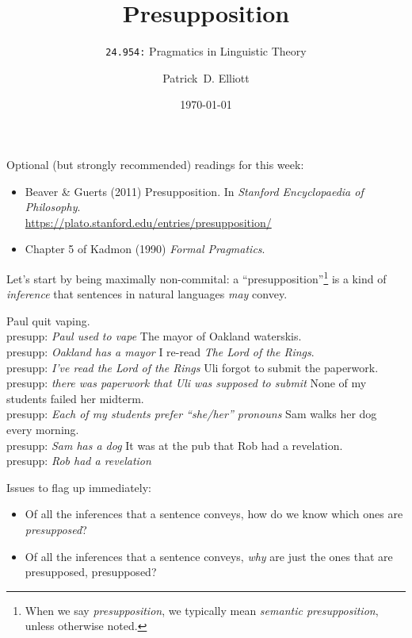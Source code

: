 \documentclass[cronos,landscape,paper=letter]{ling-handout}
\title{Presupposition}
\subtitle{\texttt{24.954:} Pragmatics in Linguistic Theory}
\date{\today}
\author{Patrick~D. Elliott}
\begin{document}
\maketitle

Optional (but strongly recommended) readings for this week:

\begin{itemize}

  \item Beaver \& Guerts (2011) Presupposition. In \textit{Stanford Encyclopaedia of Philosophy}.\\
    \url{https://plato.stanford.edu/entries/presupposition/}

  \item Chapter 5 of Kadmon (1990) \textit{Formal Pragmatics}.

\end{itemize}

Let's start by being maximally non-commital: a \enquote{presupposition}\footnote{When we say \textit{presupposition}, we typically mean \textit{semantic presupposition}, unless otherwise noted.} is a kind of \textit{inference} that sentences in natural languages \textit{may} convey.

\pex
\a Paul quit vaping.\\
presupp: \textit{Paul used to vape}
\a The mayor of Oakland waterskis.\\
presupp: \textit{Oakland has a mayor}
\a I re-read \textit{The Lord of the Rings}.\\
presupp: \textit{I've read the Lord of the Rings}
\a Uli forgot to submit the paperwork.\\
presupp: \textit{there was paperwork that Uli was supposed to submit}
\a None of my students failed her midterm.\\
presupp: \textit{Each of my students prefer \enquote{she/her} pronouns}
\a Sam walks her dog every morning.\\
presupp: \textit{Sam has a dog}
\a It was at the pub that Rob had a revelation.\\
presupp: \textit{Rob had a revelation}
\xe

Issues to flag up immediately:

\begin{itemize}

  \item Of all the inferences that a sentence conveys, how do we know which ones are \textit{presupposed}?

  \item Of all the inferences that a sentence conveys, \textit{why} are just the ones that are presupposed, presupposed?

\end{itemize}
\end{document}
